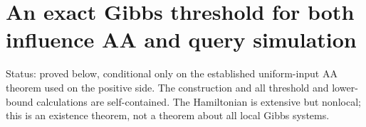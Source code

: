 \section{An exact Gibbs threshold for both influence AA and query simulation}\label{qm:an-exact-gibbs-threshold-for-both-influence-aa-and-query-simulation}\label{proof:query_models}

Status: proved below, conditional only on the established uniform-input AA theorem used on the positive side. The construction and all threshold and lower-bound calculations are self-contained. The Hamiltonian is extensive but nonlocal; this is an existence theorem, not a theorem about all local Gibbs systems.










